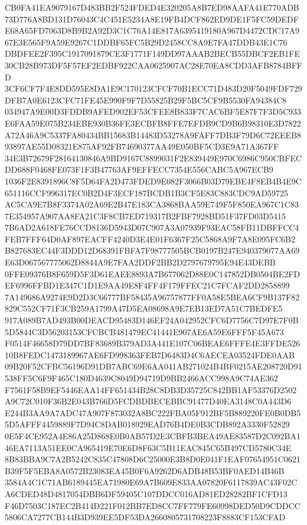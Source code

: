 \documentclass[UTF8,fontset=fandol,zihao=-4,a4paper]{ctexart}
\begin{document}
{{CB0FA41EA9079167D483BB2F524FDED4E320205A8B7ED98AAFA41E770ADB73D776A8BD131D76043C4C451E5234A8E19FB4DCF862ED9DE1F5FC59DEDF
E68A65FD7063D8B9B2A92D3C1C76A14E817A6395419180A967D4472CDC17A967E3E565F9A59E9267C1DDBF65FC5B29D2458CC8A9E7FA47DDB43E1C76
DBDFEE2F395C1917091879CE3F1771F149DD97AAAB2BECB55DBCF2EB1FE30CB28B973DF5F57EF2EDBF922CAA0625907AC28E70EA8CDD3AFB8784BFFD
3CF6CF7F4E8DD595E8DA1E9C170123CFCF70B1ECC71D483D20F5049FDF729DFB7A0E6123CFC71FE45E990F9F7D55825B29F5BC5CF9B5530FA94384C8
034947A9E00D3FDDB9AFED902EF53CFEE8B833F7CAC6BF5E87F7F3D5C933E6FAA59E075B234EBE930B36FE3ECBFB8FFE7EFDB9CD9B6B98310E3D7822
A72A46A9C5337FA80434BB15683B14483D53278A9FAFF7DB3F79D6C72EEEB893897AE55D08321E875AF92FB74690377AA49E050BF5CD3E9A71A367FF
34E3B72679F28164130846A9BD9167C8899031F2E839449E970C6986C950CBFECDD688F0468FE073F1F3B47763AF9EFFECC7354E556CABC5A967ECB9
1036F2E8391896C8F5D64FA2D473FDED9E082F3066B03D79EBE4F8EB4B4E9C651116CCF996317EC0B2D4F3ECF187BCDB1B3CF5E83C883CDC9AD59725
AC5CA9E7B8F3374A02A69E2B47E183CA3868BAA59E749F5F850EA967C1C837E354957A907AA8FA21C3F8CB7ED719317B2FBF7928BD51F37FD03D5415
7B6AD2A618FE76CCD8136D5943D07C907A3A07939F93EAC58FB11DBFFCC4FEB7FFF64D0AF897EACFF4240D3E4E01F6367F25C5868A9F7A8E095FC6B2
B827683EC44F3DDD12D68391FBFA7F98777505BCB0197B247E940379077AA69E63D067567775062D8844A9E7FAA2DDF2BB2D2797679795E94E43DEBB
0FFE09376B8F659D5F3D61EAEE8893A7B677062D88E0C147852DB0504BE2FDEF6996FFBD1E347C1D1E9AA49E8F4FF4F179FFEC21C7FCAF2DD2858899
7A149686A9274E9D2D3C66777BF58435A96757877FF0A58E5BEA6CF9B137F82829C552CF71F3CB259A1799A47D5EA08698A9E7EB13ED7A51C7BEDFE5
917A089B7AD493B00DEACD95483D146EF24A042952CFC6D7756C7D97E7F0B5D5844C3D56203153CFCBCB481479EC41441E907AE6A59E6FFF5F45A673
F0514F46658D79DD7BF83689B379AD3A441E107C06BEAE6FFFE4E3FFDE52610B8FEDC1473189967AE6FD998363FEB7D6483D4C6AECEA03524FDE0AAB
09B20F52CFBC56196D91DB7ABC69E6AA041AB271024B4BF0215AE208720D91538FF5C6F9F465C180D4639C8049D94719D9BB2466ACC998A9C74AE362
F7561F58B9EF5446EAA14FF651434B28C8DB3D35725C842BB1AF53376D2502A9C72C010F36B2E043B766D5FCDBDBECEBBC91477D40EA3148C0A443D6
E244B3AA9A7ADC47A907F873032A8BC222FBA05F912BF5B889220FE0B0DB55D5AFFF4459889F7D94C8DAB018929EAD76B4DE0B3CDB892A3330F52829
0E5F4CE952A4E86A25D868E0B0AB57D2E3CBFB3BEA49AE83587D2C092BA146EA7113A51EE0CA965419E70E6D8F63C5B11EAC845C65B497CD5780C34E
8B83BBA9C7A2B5242C835C47808D6C25000E3B8D0E041F1EAF07654951C0621B39F5F5EBA8A0572B23083EA45B0F6A9262D6ADB48B53BF0AED14B46B
3584A4C1C71AB6189445EA71980E69A7B609E833AA07820F6117839AC43F02CA6CDED48D4817054DBB6DF59405C107DDCC016AD81ED28282BF1CFD13
F46D7503C187EC2B414D221F012BB7ED8CC7FF779FE60998DED50D9CDDCC5806CA7277CB144B3D939EE5DF53DA2660805731708223F8883CF153CFAD
}}
\end{document}
